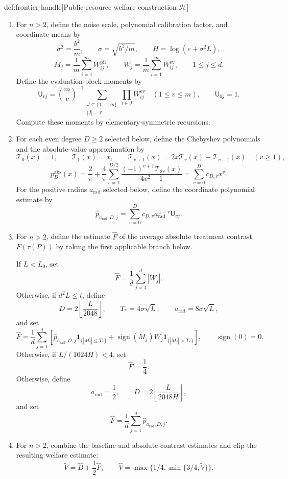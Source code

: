 \begin{algorithmv}{def:frontier-handle}[Public-resource welfare construction $\mathscr H$]
\begin{enumerate}
\item For \(n>2\), define the noise scale, polynomial calibration factor, and coordinate means by
\[
\sigma^2=\frac{b^2}{m},
\qquad \sigma=\sqrt{b^2/m},
\qquad H=\log(e+\sigma^2L),
\]
\[
M_j=\frac1m\sum_{i=1}^m W^{\mathrm{pil}}_{ij},
\qquad
\overline W_j=\frac1m\sum_{i=1}^m W^{\mathrm{ev}}_{ij},
\qquad 1\le j\le d.
\]
Define the evaluation-block moments by
\[
\mathsf U_{vj}
=
\binom{m}{v}^{-1}
\sum_{\substack{J\subseteq\{1,\ldots,m\}\\ |J|=v}}
\prod_{i\in J}W^{\mathrm{ev}}_{ij}
\quad(1\le v\le m),
\qquad
\mathsf U_{0j}=1.
\]
Compute these moments by elementary-symmetric recursions.

\item For each even degree \(D\ge2\) selected below, define the Chebyshev polynomials and the absolute-value approximation by
\[
\mathcal T_0(x)=1,
\qquad \mathcal T_1(x)=x,
\qquad
\mathcal T_{v+1}(x)
=2x\mathcal T_v(x)-\mathcal T_{v-1}(x)
\quad(v\ge1),
\]
\[
p_D^{\mathrm{abs}}(x)
=
\frac2\pi+\frac4\pi\sum_{v=1}^{D/2}
\frac{(-1)^{v+1}\mathcal T_{2v}(x)}{4v^2-1}
=
\sum_{v=0}^D c_{D,v}x^v.
\]
For the positive radius \(a_{\mathrm{rad}}\) selected below, define the coordinate polynomial estimate by
\[
\widehat p_{a_{\mathrm{rad}},D,j}
=
\sum_{v=0}^D
c_{D,v}a_{\mathrm{rad}}^{\,1-v}\mathsf U_{vj}.
\]

\item For \(n>2\), define the estimate \(\widehat F\) of the average absolute treatment contrast \(F(\tau(P))\) by taking the first applicable branch below.

If \(L<L_0\), set
\[
\widehat F=\frac1d\sum_{j=1}^d|\overline W_j|.
\]
Otherwise, if \(d^2L\le t\), define
\[
D=2\left\lfloor\frac{L}{2048}\right\rfloor,
\qquad T_*=4\sigma\sqrt L,
\qquad a_{\mathrm{rad}}=8\sigma\sqrt L,
\]
and set
\[
\widehat F
=
\frac1d\sum_{j=1}^d
\left[
\widehat p_{a_{\mathrm{rad}},D,j}
\mathbf1_{\{|M_j|\le T_*\}}
+
\operatorname{sign}(M_j)\overline W_j
\mathbf1_{\{|M_j|>T_*\}}
\right],
\qquad \operatorname{sign}(0)=0.
\]
Otherwise, if \(L/(1024H)<4\), set
\[
\widehat F=\frac14.
\]
Otherwise, define
\[
a_{\mathrm{rad}}=\frac12,
\qquad
D=2\left\lfloor\frac{L}{2048H}\right\rfloor,
\]
and set
\[
\widehat F
=\frac1d\sum_{j=1}^d
\widehat p_{a_{\mathrm{rad}},D,j}.
\]

\item For \(n>2\), combine the baseline and absolute-contrast estimates and clip the resulting welfare estimate:
\[
\widetilde V=\widehat B+\frac12\widehat F,
\qquad
\widehat V=\max\{1/4,\min\{3/4,\widetilde V\}\}.
\]


\end{enumerate}
\end{algorithmv}
